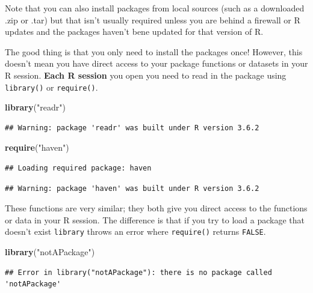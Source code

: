 \documentclass[
]{book}
\newenvironment{Shaded}{\begin{snugshade}}{\end{snugshade}}
\newcommand{\KeywordTok}[1]{\textcolor[rgb]{0.13,0.29,0.53}{\textbf{#1}}}
\newcommand{\NormalTok}[1]{#1}
\newcommand{\StringTok}[1]{\textcolor[rgb]{0.31,0.60,0.02}{#1}}
\theoremstyle{definition}
\theoremstyle{definition}
\theoremstyle{definition}
\theoremstyle{remark}
\begin{document}
Note that you can also install packages from local sources (such as a downloaded .zip or .tar) but that isn't usually required unless you are behind a firewall or R updates and the packages haven't bene updated for that version of R.

The good thing is that you only need to install the packages once! However, this doesn't mean you have direct access to your package functions or datasets in your R session. \textbf{Each R session} you open you need to read in the package using \texttt{library()} or \texttt{require()}.

\begin{Shaded}
\begin{Highlighting}[]
\KeywordTok{library}\NormalTok{(}\StringTok{"readr"}\NormalTok{)}
\end{Highlighting}
\end{Shaded}

\begin{verbatim}
## Warning: package 'readr' was built under R version 3.6.2
\end{verbatim}

\begin{Shaded}
\begin{Highlighting}[]
\KeywordTok{require}\NormalTok{(}\StringTok{"haven"}\NormalTok{)}
\end{Highlighting}
\end{Shaded}

\begin{verbatim}
## Loading required package: haven
\end{verbatim}

\begin{verbatim}
## Warning: package 'haven' was built under R version 3.6.2
\end{verbatim}

These functions are very similar; they both give you direct access to the functions or data in your R session. The difference is that if you try to load a package that doesn't exist \texttt{library} throws an error where \texttt{require()} returns \texttt{FALSE}.

\begin{Shaded}
\begin{Highlighting}[]
\KeywordTok{library}\NormalTok{(}\StringTok{"notAPackage"}\NormalTok{)}
\end{Highlighting}
\end{Shaded}

\begin{verbatim}
## Error in library("notAPackage"): there is no package called 'notAPackage'
\end{verbatim}
\end{document}
